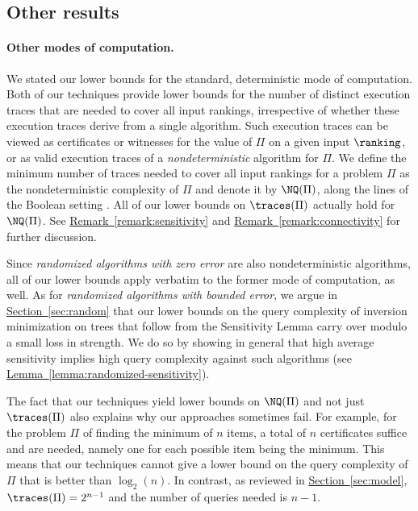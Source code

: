 \documentclass[11pt]{article}
\numberwithin{equation}{section}
\theoremstyle{definition}
\theoremstyle{plain}
\newcommand{\expref}[2]{\hyperref[#2]{#1~\ref{#2}}}
\begin{document}
\subsection{Other results}
%

\paragraph{Other modes of computation.}
We stated our lower bounds for the standard, deterministic mode of computation. Both of our techniques provide lower bounds for the number of distinct execution traces that are needed to cover all input rankings, irrespective of whether these execution traces derive from a single algorithm. Such execution traces can be viewed as certificates or witnesses for the value of $\Pi$ on a given input $\ranking$, or as valid execution traces of a \emph{nondeterministic} algorithm for $\Pi$. We define the minimum number of traces needed to cover all input rankings for a problem $\Pi$ as the nondeterministic complexity of $\Pi$ and denote it by $\NQ(\Pi)$, along the lines of the Boolean setting \cite{JRSW99}. All of our lower bounds on $\traces(\Pi)$ actually hold for $\NQ(\Pi)$. See \expref{Remark}{remark:sensitivity} and \expref{Remark}{remark:connectivity} for further discussion.

Since \emph{randomized algorithms with zero error} are also nondeterministic algorithms, all of our lower bounds apply verbatim to the former mode of computation, as well. As for \emph{randomized algorithms with bounded error}, we argue in \expref{Section}{sec:random} that our lower bounds on the query complexity of inversion minimization on trees that follow from the Sensitivity Lemma carry over modulo a small loss in strength. We do so by showing in general %
%
%
that high average sensitivity implies high query complexity against such algorithms (see \expref{Lemma}{lemma:randomized-sensitivity}).

The fact that our techniques yield lower bounds on $\NQ(\Pi)$ and not just $\traces(\Pi)$ also explains why our approaches sometimes fail. For example, for the problem $\Pi$ of finding the minimum of $n$ items, a total of $n$ certificates suffice and are needed, namely one for each possible item being the minimum. This means that our techniques cannot give a lower bound on the query complexity of $\Pi$ that is better than $\log_2(n)$. In contrast, as reviewed in \expref{Section}{sec:model}, $\traces(\Pi)=2^{n-1}$ and the number of queries needed is $n-1$. 
\end{document}
